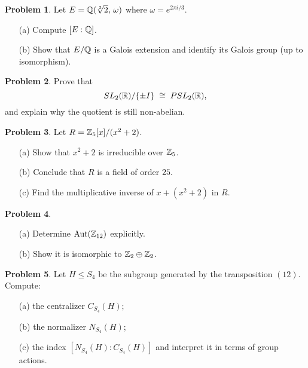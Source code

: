 \documentclass[12pt]{article}
\theoremstyle{definition} %
\newtheorem{problem}{Problem}
\theoremstyle{plain} %
\begin{document}
\bigskip
\begin{problem}
  Let \(E=\mathbb Q(\sqrt[3]{2},\,\omega)\) where
  \(\omega=e^{2\pi i/3}\).
  \begin{enumerate}
      \item[(a)] Compute \([E:\mathbb Q]\).
      \item[(b)] Show that \(E/\mathbb Q\) is a Galois extension and identify its
                Galois group (up to isomorphism).
  \end{enumerate}
\end{problem}

\bigskip
\begin{problem}
  Prove that
  \[
      SL_{2}(\mathbb R)/\{\pm I\}\;\cong\;PSL_{2}(\mathbb R),
  \]
  and explain why the quotient is still non-abelian.
\end{problem}

\bigskip
\begin{problem}
  Let
  \(R=\mathbb Z_{5}[x]/(x^{2}+2)\).
  \begin{enumerate}
      \item[(a)] Show that \(x^{2}+2\) is irreducible over \(\mathbb Z_{5}\).
      \item[(b)] Conclude that \(R\) is a field of order \(25\).
      \item[(c)] Find the multiplicative inverse of \(x+(x^{2}+2)\) in \(R\).
  \end{enumerate}
\end{problem}

\bigskip
\begin{problem}
  \begin{enumerate}
      \item[(a)] Determine \(\operatorname{Aut}(\mathbb Z_{12})\) explicitly.
      \item[(b)] Show it is isomorphic to \(\mathbb Z_{2}\oplus\mathbb Z_{2}\).
  \end{enumerate}
\end{problem}

\bigskip
\begin{problem}
  Let \(H\le S_{4}\) be the subgroup generated by the transposition \((12)\).
  Compute:
  \begin{enumerate}
      \item[(a)] the centralizer \(C_{S_{4}}(H)\);
      \item[(b)] the normalizer \(N_{S_{4}}(H)\);
      \item[(c)] the index \([N_{S_{4}}(H):C_{S_{4}}(H)]\) and interpret
                it in terms of group actions.
  \end{enumerate}
\end{problem}
\end{document}
